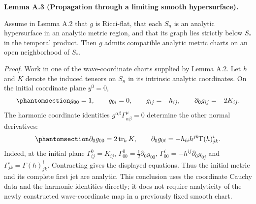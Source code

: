 \documentclass[
  english,
  11pt,
  reqno]{amsart}
\makeatletter
\newcommand{\pandocstatementheading}[1]{%
  \par\addpenalty{\@beginparpenalty}%
  \addvspace{.5\baselineskip plus .2\baselineskip minus .2\baselineskip}%
  {\normalfont\bfseries #1\par}%
  \nobreak\@afterindenttrue\@afterheading
}
\makeatother
\begin{document}
\pandocstatementheading{\protect{}\label{lem:analytic-propagation-through-limiting-slice}Lemma A.3 (Propagation through a limiting smooth hypersurface).}

Assume in Lemma A.2 that \(g\) is Ricci-flat, that each \(S_n\) is an
analytic hypersurface in an analytic metric region, and that its graph
lies strictly below \(S_*\) in the temporal product. Then \(g\) admits
compatible analytic metric charts on an open neighborhood of \(S_*\).

\emph{Proof.} Work in one of the wave-coordinate charts supplied by
Lemma A.2. Let \(h\) and \(K\) denote the induced tensors on \(S_n\) in
its intrinsic analytic coordinates. On the initial coordinate plane
\(y^0=0\),
\begin{equation}\protect\phantomsection\label{eq:analytic-persistence-initial-metric-data}{
g_{00}=1,
\qquad g_{0i}=0,
\qquad g_{ij}=-h_{ij},
\qquad \partial_0g_{ij}=-2K_{ij}.
}\end{equation} The harmonic coordinate identities
\(g^{\alpha\beta}\Gamma^\mu_{\alpha\beta}=0\) determine the other normal
derivatives:
\begin{equation}\protect\phantomsection\label{eq:analytic-persistence-initial-gauge-data}{
\partial_0g_{00}=2\operatorname{tr}_hK,
\qquad
\partial_0g_{0\ell}
=-h_{\ell i}h^{jk}\Gamma(h)^i_{jk}.
}\end{equation} Indeed, at the initial plane \(\Gamma^0_{ij}=K_{ij}\),
\(\Gamma^0_{00}=\tfrac12\partial_0g_{00}\),
\(\Gamma^i_{00}=-h^{ij}\partial_0g_{0j}\) and
\(\Gamma^i_{jk}=\Gamma(h)^i_{jk}\). Contracting gives the displayed
equations. Thus the initial metric and its complete first jet are
analytic. This conclusion uses the coordinate Cauchy data and the
harmonic identities directly; it does not require analyticity of the
newly constructed wave-coordinate map in a previously fixed smooth
chart.
\end{document}
